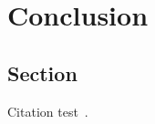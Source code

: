 
\chapter{Conclusion}\label{chapter:introduction}

\section{Section}
Citation test~\parencite{latex}.
